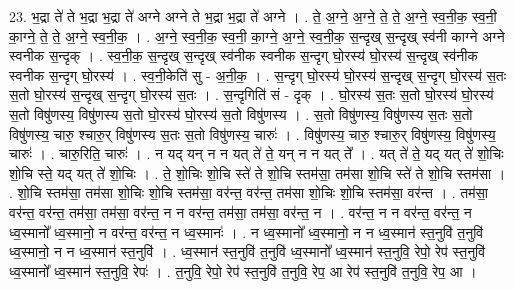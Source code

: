 \documentclass[17pt]{extarticle}
\begin{document}
23. भ॒द्रा ते॑ ते भ॒द्रा भ॒द्रा ते॑ अग्ने अग्ने ते भ॒द्रा भ॒द्रा ते॑ अग्ने । . ते॒ अ॒ग्ने॒ अ॒ग्ने॒ ते॒ ते॒ अ॒ग्ने॒ स्व॒नी॒क॒ स्व॒नी॒ का॒ग्ने॒ ते॒ ते॒ अ॒ग्ने॒ स्व॒नी॒क॒ । . अ॒ग्ने॒ स्व॒नी॒क॒ स्व॒नी॒ का॒ग्ने॒ अ॒ग्ने॒ स्व॒नी॒क॒ स॒न्दृख् स॒न्दृख् स्व॑नी काग्ने अग्ने स्वनीक स॒न्दृक् । . स्व॒नी॒क॒ स॒न्दृख् स॒न्दृख् स्व॑नीक स्वनीक स॒न्दृग् घो॒रस्य॑ घो॒रस्य॑ स॒न्दृख् स्व॑नीक स्वनीक स॒न्दृग् घो॒रस्य॑ । . स्व॒नी॒केति॑ सु - अ॒नी॒क॒ । . स॒न्दृग् घो॒रस्य॑ घो॒रस्य॑ स॒न्दृख् स॒न्दृग् घो॒रस्य॑ स॒तः स॒तो घो॒रस्य॑ स॒न्दृख् स॒न्दृग् घो॒रस्य॑ स॒तः । . स॒न्दृगिति॑ सं - दृक् । . घो॒रस्य॑ स॒तः स॒तो घो॒रस्य॑ घो॒रस्य॑ स॒तो विषु॑णस्य॒ विषु॑णस्य स॒तो घो॒रस्य॑ घो॒रस्य॑ स॒तो विषु॑णस्य । . स॒तो विषु॑णस्य॒ विषु॑णस्य स॒तः स॒तो विषु॑णस्य॒ चारु॒ श्चारु॒र् विषु॑णस्य स॒तः स॒तो विषु॑णस्य॒ चारुः॑ । . विषु॑णस्य॒ चारु॒ श्चारु॒र् विषु॑णस्य॒ विषु॑णस्य॒ चारुः॑ । . चारु॒रिति॒ चारुः॑ । . न यद् यन् न न यत् ते॑ ते॒ यन् न न यत् ते᳚ । . यत् ते॑ ते॒ यद् यत् ते॑ शो॒चिः शो॒चि स्ते॒ यद् यत् ते॑ शो॒चिः । . ते॒ शो॒चिः शो॒चि स्ते॑ ते शो॒चि स्तम॑सा॒ तम॑सा शो॒चि स्ते॑ ते शो॒चि स्तम॑सा । . शो॒चि स्तम॑सा॒ तम॑सा शो॒चिः शो॒चि स्तम॑सा॒ वर॑न्त॒ वर॑न्त॒ तम॑सा शो॒चिः शो॒चि स्तम॑सा॒ वर॑न्त । . तम॑सा॒ वर॑न्त॒ वर॑न्त॒ तम॑सा॒ तम॑सा॒ वर॑न्त॒ न न वर॑न्त॒ तम॑सा॒ तम॑सा॒ वर॑न्त॒ न । . वर॑न्त॒ न न वर॑न्त॒ वर॑न्त॒ न ध्व॒स्मानो᳚ ध्व॒स्मानो॒ न वर॑न्त॒ वर॑न्त॒ न ध्व॒स्मानः॑ । . न ध्व॒स्मानो᳚ ध्व॒स्मानो॒ न न ध्व॒स्मान॑ स्त॒नुवि॑ त॒नुवि॑ ध्व॒स्मानो॒ न न ध्व॒स्मान॑ स्त॒नुवि॑ । . ध्व॒स्मान॑ स्त॒नुवि॑ त॒नुवि॑ ध्व॒स्मानो᳚ ध्व॒स्मान॑ स्त॒नुवि॒ रेपो॒ रेप॑ स्त॒नुवि॑ ध्व॒स्मानो᳚ ध्व॒स्मान॑ स्त॒नुवि॒ रेपः॑ । . त॒नुवि॒ रेपो॒ रेप॑ स्त॒नुवि॑ त॒नुवि॒ रेप॒ आ रेप॑ स्त॒नुवि॑ त॒नुवि॒ रेप॒ आ । \newline
\end{document}

